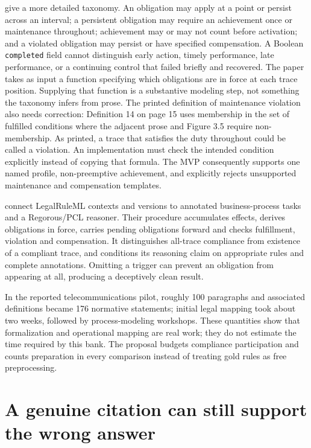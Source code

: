 \documentclass[12pt,a4paper,oneside,openany]{book}
\begin{document}
\citet[sec.~3, Definitions 10--17]{normative2016} give a more detailed taxonomy.
An obligation may apply at a point or persist across an interval; a persistent
obligation may require an achievement once or maintenance throughout; achievement
may or may not count before activation; and a violated obligation may persist or
have specified compensation. A Boolean \texttt{completed} field cannot distinguish
early action, timely performance, late performance, or a continuing control that
failed briefly and recovered. The paper takes as input a function specifying
which obligations are in force at each trace position. Supplying that function
is a substantive modeling step, not something the taxonomy infers from prose.
The printed definition of maintenance violation also needs correction:
Definition 14 on page 15 uses membership in the set of fulfilled conditions
where the adjacent prose and Figure 3.5 require non-membership. As printed,
a trace that satisfies the duty throughout could be called a violation.
An implementation must check the intended condition explicitly instead of
copying that formula.
The MVP consequently supports one named profile, non-preemptive achievement,
and explicitly rejects unsupported maintenance and compensation templates.

\citet[secs.~3--4]{semanticcompliance2016} connect LegalRuleML contexts and
versions to annotated business-process tasks and a Regorous/PCL reasoner. Their
procedure accumulates effects, derives obligations in force, carries pending
obligations forward and checks fulfillment, violation and compensation. It
distinguishes all-trace compliance from existence of a compliant trace, and
conditions its reasoning claim on appropriate rules and complete annotations.
Omitting a trigger can prevent an obligation from appearing at all, producing a
deceptively clean result.

In the reported telecommunications pilot, roughly 100 paragraphs and associated
definitions became 176 normative statements; initial legal mapping took about
two weeks, followed by process-modeling workshops. These quantities show that
formalization and operational mapping are real work; they do not estimate the
time required by this bank. The proposal budgets compliance participation and
counts preparation in every comparison instead of treating gold rules as free
preprocessing.

\section{A genuine citation can still support the wrong answer}
\label{sec:legal-ai-source-support}
\end{document}

